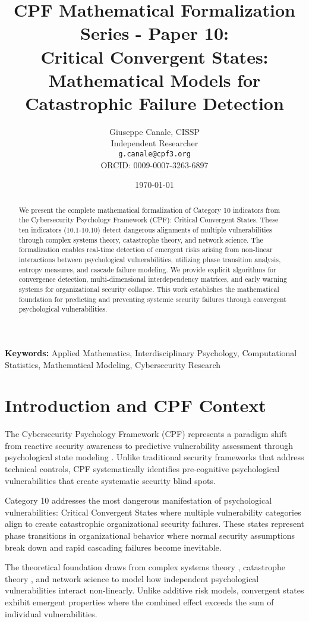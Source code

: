 \documentclass[11pt,a4paper]{article}
\title{CPF Mathematical Formalization Series - Paper 10:\\Critical Convergent States: Mathematical Models for Catastrophic Failure Detection}
\author{
    Giuseppe Canale, CISSP\\
    Independent Researcher\\
    \texttt{g.canale@cpf3.org}\\
    ORCID: 0009-0007-3263-6897
}
\date{\today}
\begin{document}
\maketitle

\begin{abstract}
We present the complete mathematical formalization of Category 10 indicators from the Cybersecurity Psychology Framework (CPF): Critical Convergent States. These ten indicators (10.1-10.10) detect dangerous alignments of multiple vulnerabilities through complex systems theory, catastrophe theory, and network science. The formalization enables real-time detection of emergent risks arising from non-linear interactions between psychological vulnerabilities, utilizing phase transition analysis, entropy measures, and cascade failure modeling. We provide explicit algorithms for convergence detection, multi-dimensional interdependency matrices, and early warning systems for organizational security collapse. This work establishes the mathematical foundation for predicting and preventing systemic security failures through convergent psychological vulnerabilities.
\end{abstract}

\textbf{Keywords:} Applied Mathematics, Interdisciplinary Psychology, Computational Statistics, Mathematical Modeling, Cybersecurity Research

\section{Introduction and CPF Context}

The Cybersecurity Psychology Framework (CPF) represents a paradigm shift from reactive security awareness to predictive vulnerability assessment through psychological state modeling \cite{canale2024cpf}. Unlike traditional security frameworks that address technical controls, CPF systematically identifies pre-cognitive psychological vulnerabilities that create systematic security blind spots.

Category 10 addresses the most dangerous manifestation of psychological vulnerabilities: Critical Convergent States where multiple vulnerability categories align to create catastrophic organizational security failures. These states represent phase transitions in organizational behavior where normal security assumptions break down and rapid cascading failures become inevitable.

The theoretical foundation draws from complex systems theory \cite{holland1995}, catastrophe theory \cite{thom1975}, and network science \cite{barabasi2002} to model how independent psychological vulnerabilities interact non-linearly. Unlike additive risk models, convergent states exhibit emergent properties where the combined effect exceeds the sum of individual vulnerabilities.
\end{document}
